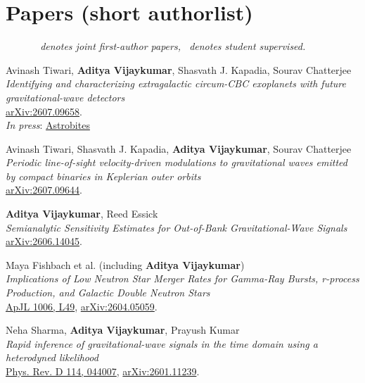 \section{Papers (short authorlist)}
	\ \ \ \ \ \ \textit{\primary~denotes joint first-author papers, \student~denotes student supervised.}
	\vspace{0.2cm}
\begin{etaremune}
        \item \student Avinash Tiwari, \textbf{Aditya Vijaykumar}, Shasvath J. Kapadia, Sourav Chatterjee \\
        \textit{Identifying and characterizing extragalactic circum-CBC exoplanets with future gravitational-wave detectors}\\
        \href{https://arxiv.org/abs/2607.09658}{arXiv:2607.09658}.\\
        \textit{In press}: \href{https://astrobites.org/2026/07/22/extragalactic-exoplanets-gws/}{Astrobites}

        \item Avinash Tiwari, Shasvath J. Kapadia, \textbf{Aditya Vijaykumar}, Sourav Chatterjee \\
        \textit{Periodic line-of-sight velocity-driven modulations to gravitational waves emitted by compact binaries in Keplerian outer orbits}\\
        \href{https://arxiv.org/abs/2607.09644}{arXiv:2607.09644}.

        \item \textbf{Aditya Vijaykumar}, Reed Essick \\
        \textit{Semianalytic Sensitivity Estimates for Out-of-Bank Gravitational-Wave Signals}\\
        \href{https://arxiv.org/abs/2606.14045}{arXiv:2606.14045}.

        \item Maya Fishbach et al. (including \textbf{Aditya Vijaykumar}) \\
        \textit{Implications of Low Neutron Star Merger Rates for Gamma-Ray Bursts, r-process Production, and Galactic Double Neutron Stars}\\
        \href{https://doi.org/10.3847/2041-8213/ae8756}{ApJL 1006, L49}, \href{https://arxiv.org/abs/2604.05059}{arXiv:2604.05059}.

        \item \student Neha Sharma, \textbf{Aditya Vijaykumar}, Prayush Kumar \\
        \textit{Rapid inference of gravitational-wave signals in the time domain using a heterodyned likelihood}\\
        \href{https://doi.org/10.1103/mjz9-41zq}{Phys. Rev. D 114, 044007}, \href{https://arxiv.org/abs/2601.11239}{arXiv:2601.11239}.


\end{etaremune}
